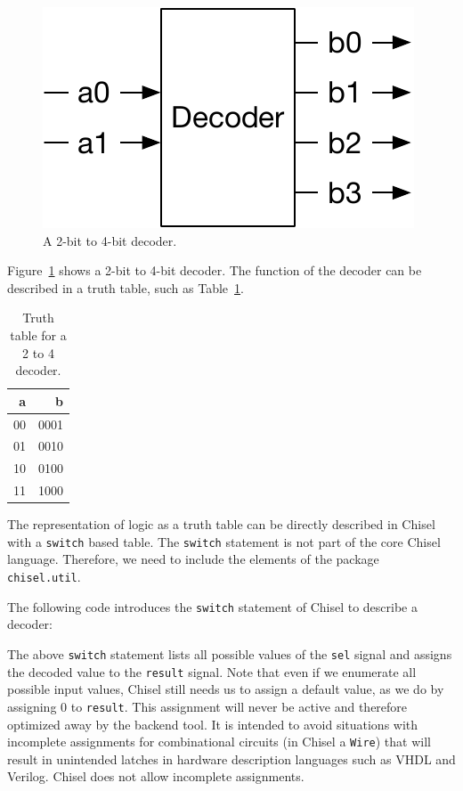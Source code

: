 \documentclass[%
    10pt, %
    headinclude, footexclude,
    openright, %
    notitlepage,
    cleardoubleempty,
    headsepline,
    pointlessnumbers,
    bibtotoc, idxtotoc,
    ]{scrbook}
\newcommand{\code}[1]{{\small{\texttt{#1}}}}
\newcommand{\scale}{0.7}
\begin{document}
\begin{figure}
  \centering
  \includegraphics[scale=\scale]{figures/decoder}
  \caption{A 2-bit to 4-bit decoder.}
  \label{fig:decoder}
\end{figure}

Figure~\ref{fig:decoder} shows a 2-bit to 4-bit decoder. The function of the decoder
can be described in a truth table, such as Table~\ref{tab:decoder}.

\begin{table}
 \centering
 \label{tab:decoder}
  \begin{tabular}{rr}
    \toprule
    a & b \\
    \midrule
    00 & 0001 \\
    01 & 0010 \\
    10 & 0100 \\
    11 & 1000 \\
    \bottomrule 
  \end{tabular} 
  \caption{Truth table for a 2 to 4 decoder.}
\end{table}

The representation of logic as a truth table can be directly described in Chisel with a
\code{switch} based table.
The \code{switch} statement is not part of the core Chisel language.
Therefore, we need to include the elements of the package \code{chisel.util}.



\noindent The following code introduces the \code{switch} statement of Chisel to describe a decoder:



\noindent The above \code{switch} statement lists all possible values of the \code{sel} signal
and assigns the decoded value to the \code{result} signal.
Note that even if we enumerate all possible input values, Chisel still needs us to assign a
default value, as we do by assigning 0 to \code{result}.
This assignment will never be active and therefore optimized away by the backend tool.
It is intended to avoid situations with incomplete assignments for combinational circuits
(in Chisel a \code{Wire}) that will result in unintended latches in hardware description
languages such as VHDL and Verilog. Chisel does not allow incomplete assignments.
\end{document}
